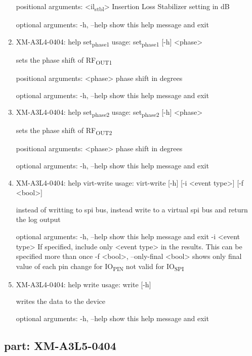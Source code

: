 \documentclass[11pt]{article}
\begin{document}
\begin{enumerate}
positional arguments:
  <il\textsubscript{stbl}>   Insertion Loss Stabilizer setting in dB

optional arguments:
  -h, --help  show this help message and exit

\item XM-A3L4-0404: help set\textsubscript{phase}\textsubscript{1}
\label{sec:org505ab71}
usage: set\textsubscript{phase}\textsubscript{1} [-h] <phase>

sets the phase shift of RF\textsubscript{OUT1}

positional arguments:
  <phase>     phase shift in degrees

optional arguments:
  -h, --help  show this help message and exit

\item XM-A3L4-0404: help set\textsubscript{phase}\textsubscript{2}
\label{sec:org83d0a54}
usage: set\textsubscript{phase}\textsubscript{2} [-h] <phase>

sets the phase shift of RF\textsubscript{OUT2}

positional arguments:
  <phase>     phase shift in degrees

optional arguments:
  -h, --help  show this help message and exit

\item XM-A3L4-0404: help virt-write
\label{sec:orga82dac8}
usage: virt-write [-h] [-i <event type>] [-f <bool>]

instead of writting to spi bus, instead write to a virtual spi bus and return
the log output

optional arguments:
  -h, --help            show this help message and exit
  -i <event type>       If specified, include only <event type> in the
                        results. This can be specified more than once
  -f <bool>, --only-final <bool>
                        shows only final value of each pin change for IO\textsubscript{PIN}
                        not valid for IO\textsubscript{SPI}

\item XM-A3L4-0404: help write
\label{sec:org1223523}
usage: write [-h]

writes the data to the device

optional arguments:
  -h, --help  show this help message and exit
\end{enumerate}

\subsection{part: XM-A3L5-0404}
\label{sec:org77d3e24}
\end{document}
